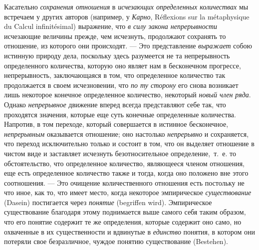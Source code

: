 {Касательно {\em сохранения отношения} в
{\em исчезающих определенных количествах} мы встречаем
у других авторов (например, у {\em Карно},
Réflexions sur la métaphysique du Calcul infinitésimal)
выражение, что {\em в силу закона непрерывности}
исчезающие величины прежде, чем исчезнуть, продолжают
сохранять то отношение, из которого они происходят. — Это представление
{\em выражает} собою истинную природу дела, поскольку
здесь разумеется не та непрерывность определенного количества, которую оно
являет нам в бесконечном прогрессе, непрерывность, заключающаяся в том, что
определенное количество так продолжается в своем исчезновении, что
{\em по ту сторону} его снова возникает лишь некоторое
конечное определенное количество, некоторый {\em новый
член ряда}. Однако {\em непрерывное} движение вперед
всегда представляют себе так, что проходятся значения, которые еще суть
конечные определенные количества. Напротив, в том переходе, который
совершается в истинное бесконечное, {\em непрерывным}
оказывается отношение; оно настолько {\em непрерывно} и
сохраняется, что переход исключительно только и состоит в том, что он
выделяет отношение в чистом виде и заставляет исчезнуть безотносительное
определение,~т.~е. то обстоятельство, что определенное количество,
являющееся членом отношения, еще есть определенное количество также и
тогда, когда оно положено вне этого соотношения. — Это очищение
количественного отношения есть постольку не что иное, как то, что имеет
место, когда некоторое эмпирическое {\em существование}
(Dasein) постигается через {\em понятие} (begriffen
wird). Эмпирическое существование благодаря этому поднимается выше самого
себя таким образом, что его понятие содержит те же определения, которые
содержит оно само, но охваченные в их существенности и вдвинутые в
{\em единство} понятия, в котором они потеряли свое
безразличное, чуждое понятию существование (Bestehen).

}
